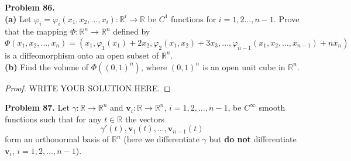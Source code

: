 \documentclass[11pt]{article}
\theoremstyle{definition}
\theoremstyle{definition}
\begin{document}
\medskip

\noindent
{\bf Problem 86.}\\
{\bf (a)}
Let $\varphi_i=\varphi_i(x_1,x_2,\ldots,x_i):\mathbb{R}^i\to\mathbb{R}$
be $C^1$ functions for $i=1,2\ldots, n-1$.
Prove that the mapping
$\Phi:\mathbb{R}^n\to\mathbb{R}^n$ defined by
$$
\Phi(x_1,x_2,\ldots,x_n) =
(x_1,\varphi_1(x_1)+2x_2, \varphi_2(x_1,x_2)+3x_3,\ldots,
\varphi_{n-1}(x_1,x_2,\ldots,x_{n-1})+nx_n)
$$
is a diffeomorphism onto an open subset of $\mathbb{R}^n$.\\
{\bf (b)} Find the volume of $\Phi((0,1)^n)$, where $(0,1)^n$
is an open unit cube in $\mathbb{R}^n$.
\begin{proof}
	WRITE YOUR SOLUTION HERE.
\end{proof}



\medskip


\noindent
{\bf Problem 87.}
Let $\gamma:\mathbb{R}\to\mathbb{R}^n$ and $\mathbf{v}_i:\mathbb{R}\to\mathbb{R}^n$, $i=1,2,\ldots,n-1$, be $C^\infty$ smooth functions such that
for any $t\in\mathbb{R}$ the vectors
$$
\gamma'(t),\mathbf{v}_1(t),\ldots,\mathbf{v}_{n-1}(t)
$$
form an orthonormal basis of $\mathbb{R}^n$ (here we differentiate $\gamma$ but {\bf do not} differentiate $\mathbf{v}_i$, $i=1,2,\ldots,n-1$).
\end{document}
